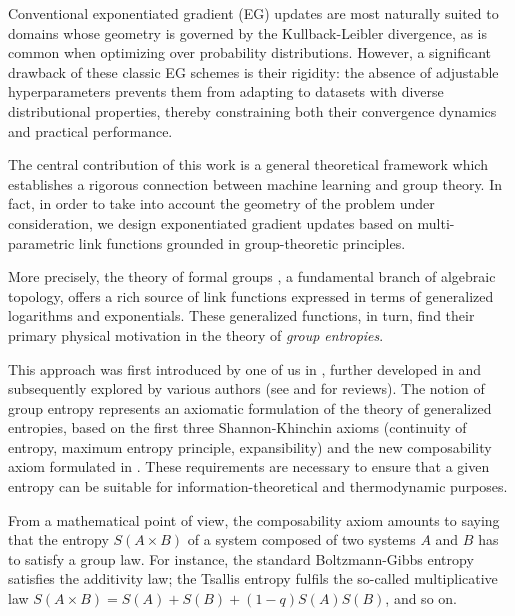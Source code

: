 \documentclass[10pt]{amsart}
\theoremstyle{definition}
\theoremstyle{definition}	 %
\begin{document}


Conventional exponentiated gradient (EG) updates are most naturally suited to domains whose geometry is governed by the Kullback-Leibler divergence, as is common when optimizing over probability distributions. However, a significant drawback of these classic EG schemes is their rigidity: the absence of adjustable hyperparameters prevents them from adapting to datasets with diverse distributional properties, thereby constraining both their convergence dynamics and practical performance.


The central contribution of this work is a general theoretical framework which establishes a rigorous connection between machine learning and group theory. In fact, in order to take into account the geometry of the problem under consideration, we design exponentiated gradient updates based on multi-parametric link functions grounded in group-theoretic principles.


More precisely, the theory of formal groups \cite{Haze,Serre}, a fundamental branch of algebraic topology, offers a rich source of link functions expressed in terms of generalized logarithms and exponentials. These generalized functions, in turn,  find their primary physical motivation in the theory of \textit{group entropies}.

This approach was first introduced by one of us in \cite{PT2011PRE}, further developed in \cite{tempesta2015,PT2016AOP,tempesta2016,PT2020CHA} and subsequently explored by various authors (see \cite{RRT2019PRSA,TJ2020SR,ADT2021CHA,ADTCHA2022} and \cite{JT2018ENT,JT2024ENT} for reviews). The notion of group entropy represents an axiomatic formulation of the theory of generalized entropies, based on the first three Shannon-Khinchin axioms (continuity of entropy, maximum entropy principle, expansibility) and the new composability axiom formulated in \cite{PT2016AOP}.  These requirements are necessary to ensure that a given entropy can be suitable for information-theoretical and thermodynamic purposes.


From a mathematical point of view, the composability axiom amounts to saying that the entropy $S(A\times B)$ of a system composed of two systems $A$ and $B$ has to satisfy a group law. For instance, the standard Boltzmann-Gibbs entropy satisfies the additivity law; the Tsallis entropy fulfils the so-called multiplicative law $S(A\times B)= S(A) + S(B)+ (1-q)S(A)S(B)$, and so on.
\end{document}
